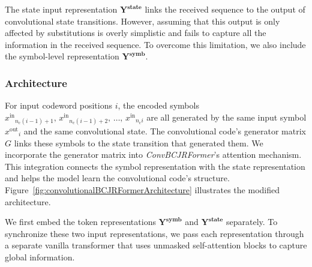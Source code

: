 \documentclass[conference,letterpaperu]{IEEEtran}
\newcommand{\cc}{\ensuremath{,\,}}
\newcommand{\yinIx}{\ensuremath{x^{\text{in}}}}
\newcommand{\youtIx}{\ensuremath{x^{\text{out}}}}
\newcommand{\bcjrformerInputBit}{\ensuremath{\bm{Y^{\text{symb}}}}}
\newcommand{\bcjrformerInputState}{\ensuremath{\bm{Y^{\text{state}}}}}
\newcommand{\convn}{\ensuremath{n_\text{c}}}
\begin{document}
The state input representation $\bcjrformerInputState$ links the received sequence to the output of convolutional state transitions. However, assuming that this output is only affected by substitutions is overly simplistic and fails to capture all the information in the received sequence. To overcome this limitation, we also include the symbol-level representation $\bcjrformerInputBit$.  
\subsubsection{Architecture}

For input codeword positions $i$, the encoded symbols $\yinIx_{\convn(i-1)+1}\cc \yinIx_{\convn(i-1)+2} \cc \ldots \cc \yinIx_{\convn i}$ are all generated by the same input symbol $\youtIx_i$ and the same convolutional state. The convolutional code's generator matrix $G$ links these symbols to the state transition that generated them. We incorporate the generator matrix into \mbox{\textit{ConvBCJRFormer}'s} attention mechanism. This integration connects the symbol representation with the state representation and helps the model learn the convolutional code's structure. Figure~\ref{fig:convolutionalBCJRFormerArchitecture} illustrates the modified architecture.  

We first embed the token representations $\bcjrformerInputBit$ and $\bcjrformerInputState$ separately. To synchronize these two input representations, we pass each representation through a separate vanilla transformer that uses unmasked self-attention blocks to capture global information.
\end{document}
